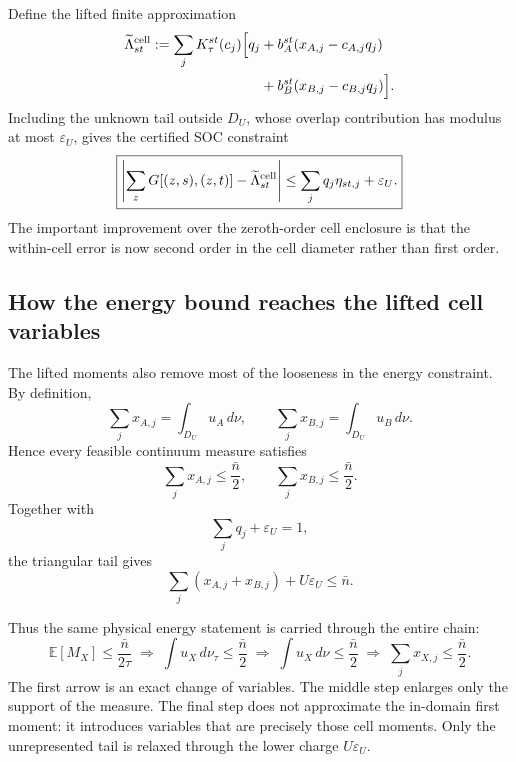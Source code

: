 \documentclass[11pt]{article}
\theoremstyle{remark}
\begin{document}
Define the lifted finite approximation
\begin{align}
    \widetilde\Lambda_{st}^{\rm cell}
    :=
    \sum_j
    K_\tau^{st}(c_j)
    \Big[
      q_j
      &+
      b_A^{st}(x_{A,j}-c_{A,j}q_j)
      \nonumber\\
      &+
      b_B^{st}(x_{B,j}-c_{B,j}q_j)
    \Big].
    \label{eq:stage3-lifted-overlap}
\end{align}
Including the unknown tail outside \(D_U\), whose overlap contribution has
modulus at most \(\varepsilon_U\), gives the certified SOC constraint
\begin{equation}
\boxed{
    \left|
      \sum_zG[(z,s),(z,t)]
      -
      \widetilde\Lambda_{st}^{\rm cell}
    \right|
    \le
    \sum_jq_j\eta_{st,j}
    +
    \varepsilon_U.
}
    \label{eq:stage3-certified-soc}
\end{equation}
The important improvement over the zeroth-order cell enclosure is that the
within-cell error is now second order in the cell diameter rather than first
order.

\subsection{How the energy bound reaches the lifted cell variables}

The lifted moments also remove most of the looseness in the energy
constraint.  By definition,
\[
    \sum_jx_{A,j}
    =
    \int_{D_U}u_A\,d\nu,
    \qquad
    \sum_jx_{B,j}
    =
    \int_{D_U}u_B\,d\nu.
\]
Hence every feasible continuum measure satisfies
\begin{equation}
    \boxed{
    \sum_jx_{A,j}\le\frac{\bar n}{2},
    \qquad
    \sum_jx_{B,j}\le\frac{\bar n}{2}.
    }
    \label{eq:stage3-cell-perarm-energy}
\end{equation}
Together with
\[
    \sum_jq_j+\varepsilon_U=1,
\]
the triangular tail gives
\begin{equation}
    \boxed{
    \sum_j(x_{A,j}+x_{B,j})
    +
    U\varepsilon_U
    \le
    \bar n.
    }
    \label{eq:stage3-cell-total-energy}
\end{equation}

Thus the same physical energy statement is carried through the entire chain:
\begin{equation}
\boxed{
\mathbb E[M_X]\le\frac{\bar n}{2\tau}
\;\Longrightarrow\;
\int u_X\,d\nu_\tau\le\frac{\bar n}{2}
\;\Longrightarrow\;
\int u_X\,d\nu\le\frac{\bar n}{2}
\;\Longrightarrow\;
\sum_jx_{X,j}\le\frac{\bar n}{2}.
}
\label{eq:stage3-energy-chain}
\end{equation}
The first arrow is an exact change of variables.  The middle step enlarges
only the support of the measure.  The final step does not approximate the
in-domain first moment: it introduces variables that are precisely those cell
moments.  Only the unrepresented tail is relaxed through the lower charge
\(U\varepsilon_U\).
\end{document}
